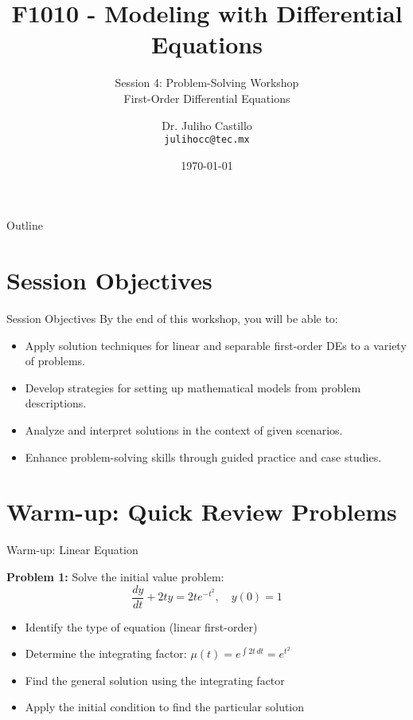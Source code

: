 \documentclass[10pt,aspectratio=169]{beamer}
\title{F1010 - Modeling with Differential Equations}
\subtitle{Session 4: Problem-Solving Workshop \\ First-Order Differential Equations}
\author{Dr. Juliho Castillo \\ \texttt{julihocc@tec.mx}}
\institute{Tec de Monterrey}
\date{\today}
\newcommand{\concept}[1]{\textbf{#1}}
\newcommand{\formula}[1]{\textit{#1}}
\begin{document}
\maketitle

\begin{frame}{Outline}
    \tableofcontents
\end{frame}

\section{Session Objectives}
\begin{frame}{Session Objectives}
    By the end of this workshop, you will be able to:
    \begin{itemize}
        \item Apply solution techniques for linear and separable first-order DEs to a variety of problems.
        \item Develop strategies for setting up mathematical models from problem descriptions.
        \item Analyze and interpret solutions in the context of given scenarios.
        \item Enhance problem-solving skills through guided practice and case studies.
    \end{itemize}
\end{frame}

\section{Warm-up: Quick Review Problems}
\begin{frame}{Warm-up: Linear Equation}
    \begin{problembox}
        \concept{Problem 1:} Solve the initial value problem:
        \formula{\[ \frac{dy}{dt} + 2ty = 2te^{-t^2}, \quad y(0) = 1 \]}
    \end{problembox}
    
    \begin{solutionbox}
        \begin{itemize}
            \item Identify the type of equation (linear first-order)
            \item Determine the integrating factor: $\mu(t) = e^{\int 2t \, dt} = e^{t^2}$
            \item Find the general solution using the integrating factor
            \item Apply the initial condition to find the particular solution
        \end{itemize}
    \end{solutionbox}
\end{frame}
\end{document}
